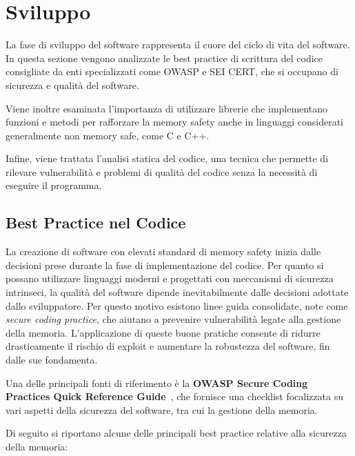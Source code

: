 \section{Sviluppo}
\label{sec:development}

La fase di sviluppo del software rappresenta il cuore del ciclo di vita del software.
In questa sezione vengono analizzate le best practice di scrittura del codice
consigliate da enti specializzati come OWASP e SEI CERT, che si occupano di sicurezza
e qualità del software.

Viene inoltre esaminata l'importanza di utilizzare librerie che implementano funzioni
e metodi per rafforzare la memory safety anche in linguaggi considerati generalmente
non memory safe, come C e C++.

Infine, viene trattata l'analisi statica del codice, una tecnica che permette di
rilevare vulnerabilità e problemi di qualità del codice senza la necessità di
eseguire il programma.

\subsection{Best Practice nel Codice}
\label{sec:best-practices-codice}

La creazione di software con elevati standard di memory safety inizia dalle decisioni
prese durante la fase di implementazione del codice. Per quanto si possano
utilizzare linguaggi moderni e progettati con meccanismi di sicurezza intrinseci,
la qualità del software dipende inevitabilmente dalle decisioni adottate dallo sviluppatore.
Per questo motivo esistono linee guida consolidate, note come \textit{secure
coding practice}, che aiutano a prevenire vulnerabilità legate alla gestione della
memoria. L'applicazione di queste buone pratiche consente di ridurre
drasticamente il rischio di exploit e aumentare la robustezza del software, fin dalle
sue fondamenta.

Una delle principali fonti di riferimento è la \textbf{OWASP Secure Coding
Practices Quick Reference Guide}~\cite{owasp_best_practices}, che fornisce una checklist
focalizzata su vari aspetti della sicurezza del software, tra cui la gestione
della memoria.

Di seguito si riportano alcune delle principali best practice relative alla
sicurezza della memoria:

